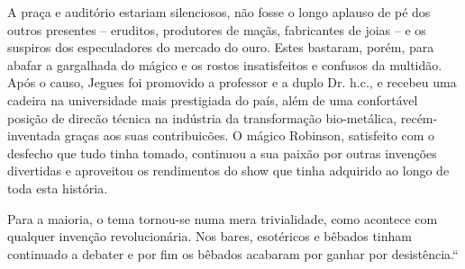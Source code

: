 A praça e auditório estariam silenciosos, não fosse o longo
aplauso de pé dos outros presentes – eruditos, produtores de
maçãs, fabricantes de joias – e os suspiros dos especuladores
do mercado do ouro. Estes bastaram, porém, para abafar a
gargalhada do mágico e os rostos insatisfeitos e confusos da
multidão. Após o causo, Jegues foi promovido a professor
e a duplo Dr. h.c., e recebeu uma cadeira na universidade mais
prestigiada do país, além de uma confortável posição de direcão
técnica na indústria da transformação bio-metálica,
recém-inventada graças aos suas contribuicões. O mágico Robinson,
satisfeito com o desfecho que tudo tinha tomado, continuou a
sua paixão por outras invenções divertidas e aproveitou os
rendimentos do show que tinha adquirido ao longo de toda esta
história. 

Para a maioria, o tema tornou-se numa mera
trivialidade, como acontece com qualquer invenção
revolucionária. Nos bares, esotéricos e bêbados tinham continuado a
debater e por fim os bêbados acabaram por ganhar por desistência.“